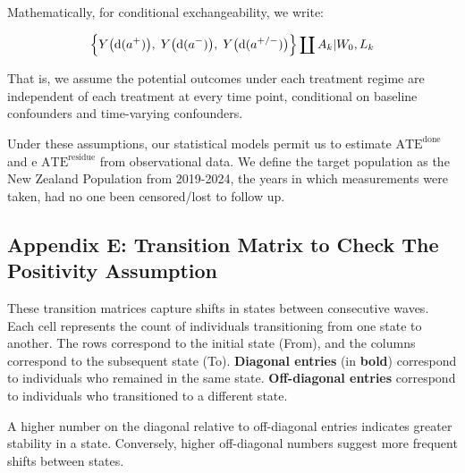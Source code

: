 \documentclass[
  single column]{article}
\begin{document}
Mathematically, for conditional exchangeability, we write:

\[
\Bigl\{
  Y\bigl(\boldsymbol{\text{d}}(a^+)\bigr), 
  \; 
  Y\bigl(\boldsymbol{\text{d}}(a^-)\bigr), 
  \; 
  Y\bigl(\boldsymbol{\text{d}}(a^{+/-})\bigr)
\Bigr\}
\coprod
A_k |
W_0,
L_k
\]

That is, we assume the potential outcomes under each treatment regime
are independent of each treatment at every time point, conditional on
baseline confounders and time-varying confounders.

Under these assumptions, our statistical models permit us to estimate
\(\text{ATE}^{\text{done}}\) and e \(\text{ATE}^{\text{residue}}\) from
observational data. We define the target population as the New Zealand
Population from 2019-2024, the years in which measurements were taken,
had no one been censored/lost to follow up.

\newpage{}

\subsection{Appendix E: Transition Matrix to Check The Positivity
Assumption}\label{appendix-transition}

These transition matrices capture shifts in states between consecutive
waves. Each cell represents the count of individuals transitioning from
one state to another. The rows correspond to the initial state (From),
and the columns correspond to the subsequent state (To).
\textbf{Diagonal entries} (in \textbf{bold}) correspond to individuals
who remained in the same state. \textbf{Off-diagonal entries} correspond
to individuals who transitioned to a different state.

A higher number on the diagonal relative to off-diagonal entries
indicates greater stability in a state. Conversely, higher off-diagonal
numbers suggest more frequent shifts between states.
\end{document}
